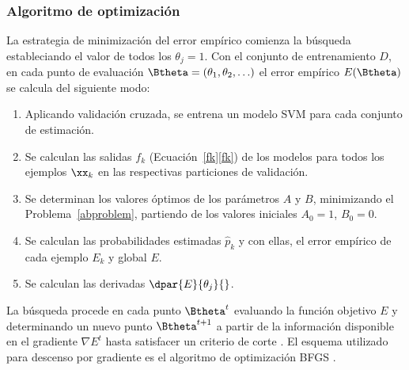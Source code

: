 %
\subsubsection{Algoritmo de optimización}
%
La estrategia de minimización del error empírico comienza la búsqueda
estableciando el valor de todos los  $\theta_j=1$.
Con el conjunto de entrenamiento $D$, en cada punto de evaluación
$\Btheta=(\theta_1,\theta_2,\ldots)$ el error empírico
$E(\Btheta)$ se calcula del siguiente modo:
%
\begin{enumerate}
\item
  Aplicando validación cruzada, se entrena un modelo SVM para cada
  conjunto de estimación.
\item
  Se calculan las salidas $f_k$
  (\iflatexml{}Ecuación~\ref{fk}\else\autoref{fk}\fi) de los modelos
  para todos los ejemplos $\xx_k$ en las respectivas particiones de
  validación.
\item
  Se determinan los valores óptimos de los parámetros $A$ y $B$,
  minimizando el Problema~\ref{abproblem}, partiendo de los
  valores iniciales $A_0=1$, $B_0=0$.
\item
  Se calculan las probabilidades estimadas $\hat{p}_k$ y con ellas, el
  error empírico de cada ejemplo $E_k$ y global $E$.
\item
  Se calculan las derivadas $\dpar{E}{\theta_j}{}$.
\end{enumerate}
%
La búsqueda procede en cada punto $\Btheta^t$ evaluando la función
objetivo $E$ y determinando un nuevo punto $\Btheta^{t+1}$ a
partir de la información disponible en el gradiente
$\nabla{}E^t$ hasta satisfacer un criterio de corte%
.
El esquema utilizado para descenso por gradiente es el algoritmo de
optimización BFGS \cite{nocedal}.

